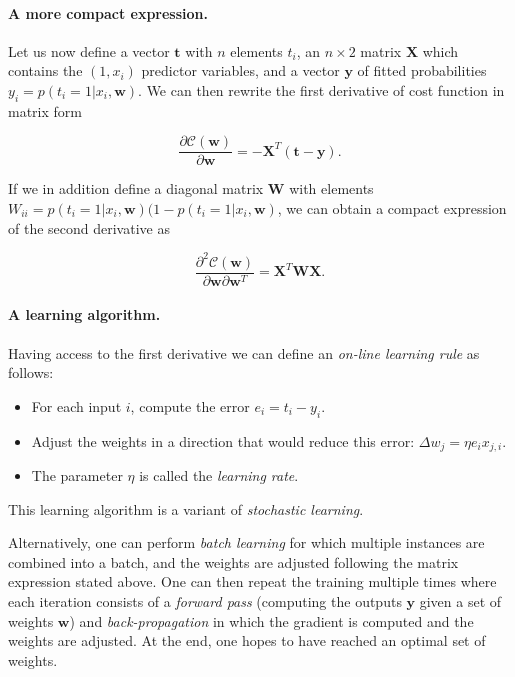\documentclass[%
oneside,                 %
final,                   %
10pt]{article}
\newenvironment{notice_mdfboxadmon}[1][]{
\begin{notice_mdfboxmdframed}[frametitle=#1]
}
{
\end{notice_mdfboxmdframed}
}
\begin{document}
\paragraph{A more compact expression.}
Let us now define a vector $\boldsymbol{t}$ with $n$ elements $t_i$, an
$n\times 2$ matrix $\boldsymbol{X}$ which contains the $(1, x_i)$ predictor variables, and a
vector $\boldsymbol{y}$ of fitted probabilities $y_i = p(t_i = 1 \vert x_i,\boldsymbol{w})$. We can then rewrite the first
derivative of cost function in matrix form

\[
\frac{\partial \mathcal{C}(\boldsymbol{w})}{\partial \boldsymbol{w}} = -\boldsymbol{X}^T\left( \boldsymbol{t}-\boldsymbol{y} \right). 
\]

If we in addition define a diagonal matrix $\boldsymbol{W}$ with elements 
$W_{ii} = p(t_i = 1 \vert x_i,\boldsymbol{w}) (1-p(t_i=1\vert x_i,\boldsymbol{w})$, we can obtain a compact expression of the second derivative as 

\[
\frac{\partial^2 \mathcal{C}(\boldsymbol{w})}{\partial \boldsymbol{w}\partial \boldsymbol{w}^T} = \boldsymbol{X}^T\boldsymbol{W}\boldsymbol{X}. 
\]

\paragraph{A learning algorithm.}

\begin{notice_mdfboxadmon}[Notice]
Having access to the first derivative we can define an \emph{on-line learning rule} as follows:
\begin{itemize}
\item For each input $i$, compute the error $e_i = t_i - y_i$.

\item Adjust the weights in a direction that would reduce this error: $\Delta w_j = \eta e_i x_{j,i}$.

\item The parameter $\eta$ is called the \emph{learning rate}.
\end{itemize}

\noindent
This learning algorithm is a variant of \emph{stochastic learning}.
\end{notice_mdfboxadmon} %



Alternatively, one can perform \emph{batch learning} for which multiple instances are combined into a batch, and the weights are adjusted following the matrix expression stated above. One can then repeat the training multiple times where each iteration consists of a \emph{forward pass} (computing the outputs $\boldsymbol{y}$ given a set of weights $\boldsymbol{w}$) and \emph{back-propagation} in which the gradient is computed and the weights are adjusted. At the end, one hopes to have reached an optimal set of weights.
\end{document}
